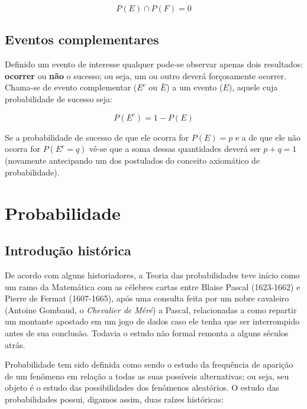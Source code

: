 \documentclass[
]{book}
\begin{document}
\[
P(E) \cap P(F) = 0
\]

\hypertarget{eventos-complementares}{%
\subsection{Eventos complementares}\label{eventos-complementares}}

Definido um evento de interesse qualquer pode-se observar apenas dois resultados: \textbf{ocorrer} ou \textbf{não} o sucesso; ou seja, um ou outro deverá forçosamente ocorrer.\\

Chama-se de evento complementar (\(E^{c}\) ou \(\stackrel{-}{E}\)) a um evento (\(E\)), aquele cuja probabilidade de sucesso seja:

\[
P(E^{c}) = 1 - P(E)
\]

Se a probabilidade de sucesso de que ele ocorra for \(P(E)=p\) e a de que ele não ocorra for \(P(E^{c}= q)\) vê-se que a soma dessas quantidades deverá ser \(p + q =1\) (novamente antecipando um dos postulados do conceito axiomático de probabilidade).

\hypertarget{probabilidade}{%
\section{Probabilidade}\label{probabilidade}}

\hypertarget{introduuxe7uxe3o-histuxf3rica}{%
\subsection{Introdução histórica}\label{introduuxe7uxe3o-histuxf3rica}}

De acordo com alguns historiadores, a Teoria das probabilidades teve início como um ramo da Matemática com as célebres cartas entre Blaise Pascal (1623-1662) e Pierre de Fermat (1607-1665), após uma consulta feita por um nobre cavaleiro (Antoine Gombaud, o \emph{Chevalier de Méré}) a Pascal, relacionadas a como repartir um montante apostado em um jogo de dados caso ele tenha que ser interrompido antes de sua conclusão. Todavia o estudo não formal remonta a alguns séculos atrás.

\hfill\break

Probabilidade tem sido definida como sendo o estudo da frequência de aparição de um fenômeno em relação a todas as suas possíveis alternativas; ou seja, seu objeto é o estudo das possibilidades dos fenômenos aleatórios. O estudo das probabilidades possui, digamos assim, duas raízes históricas:
\end{document}
